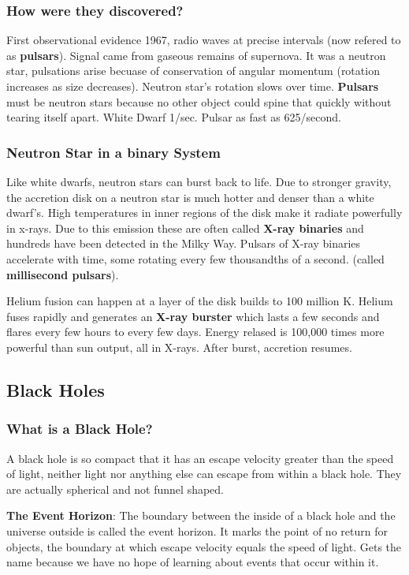 \subsubsection{How were they discovered?}
First observational evidence 1967, radio waves at precise intervals (now refered to as {\bf pulsars}). Signal came from gaseous remains of supernova. It was a neutron star, pulsations arise becuase of conservation of angular momentum (rotation increases as size decreases). Neutron star's rotation slows over time. {\bf Pulsars} must be neutron stars because no other object could spine that quickly without tearing itself apart. White Dwarf 1/sec. Pulsar as fast as 625/second.

\subsubsection{Neutron Star in a binary System}
Like white dwarfs, neutron stars can burst back to life. Due to stronger gravity, the accretion disk on a neutron star is much hotter and denser than a white dwarf's. High temperatures in inner regions of the disk make it radiate powerfully in x-rays. Due to this emission these are often called {\bf X-ray binaries} and hundreds have been detected in the Milky Way. Pulsars of X-ray binaries accelerate with time, some rotating every few thousandths of a second. (called {\bf millisecond pulsars}).

Helium fusion can happen at a layer of the disk builds to 100 million K. Helium fuses rapidly and generates an {\bf X-ray burster} which lasts a few seconds and flares every few hours to every few days. Energy relased is 100,000 times more powerful than sun output, all in X-rays. After burst, accretion resumes.

\subsection{Black Holes}
\subsubsection{What is a Black Hole?}
A black hole is so compact that it has an escape velocity greater than the speed of light, neither light nor anything else can escape from within a black hole. They are actually spherical and not funnel shaped.

{\bf The Event Horizon}: The boundary between the inside of a black hole and the universe outside is called the event horizon. It marks the point of no return for objects, the boundary at which escape velocity equals the speed of light. Gets the name because we have no hope of learning about events that occur within it.

